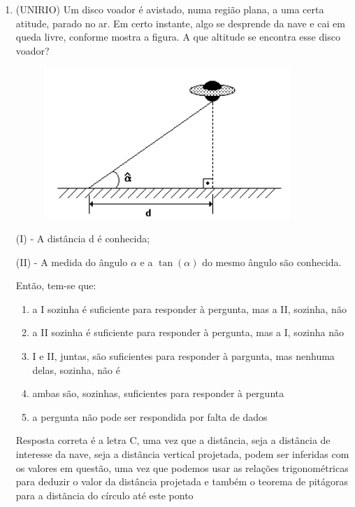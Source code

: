 \begin{multicols*}{2}
\begin{enumerate}
        \item (UNIRIO) Um disco voador é avistado, numa região plana, a uma certa atitude, parado no ar. Em certo instante, algo se desprende da nave e cai em queda livre, conforme mostra a figura. A que altitude se encontra esse disco voador?
              \begin{figure}[H]
                  \centering
                  \includegraphics[scale=0.45]{assets/rafael/img40.png}
              \end{figure}
              (I) - A distância d é conhecida;

              (II) - A medida do ângulo $\alpha$ e a $\tan(\alpha)$ do mesmo ângulo são conhecida.

              Então, tem-se que:
              \begin{enumerate}
                  \item a I sozinha é suficiente para responder à pergunta, mas a II, sozinha, não
                  \item a II sozinha é suficiente para responder à pergunta, mas a I, sozinha não
                  \item I e II, juntas, são suficientes para responder à pargunta, mas nenhuma delas, sozinha, não é
                  \item ambas são, sozinhas, suficientes para responder à pergunta
                  \item a pergunta não pode ser respondida por falta de dados
              \end{enumerate}
              Resposta correta é a letra C, uma vez que a distância, seja a distância de interesse da nave, seja a distãncia vertical projetada, podem ser inferidas com os valores em questão, uma vez que podemos usar as relações trigonométricas para deduzir o valor da distância projetada e também o teorema de pitágoras para a distãncia do círculo até este ponto
    \end{enumerate}


    

    

\end{multicols*}